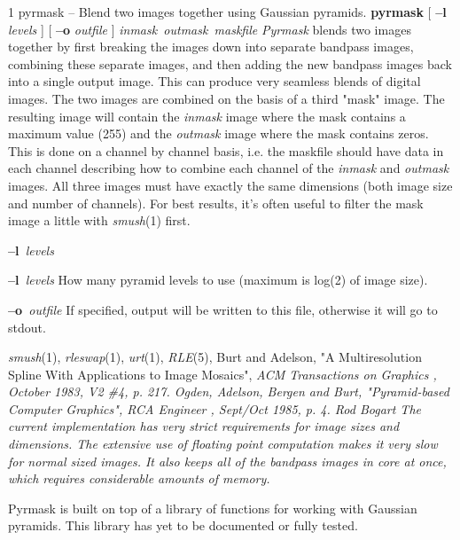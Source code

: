 %
%
%
 1
pyrmask -- Blend two images together using Gaussian pyramids.
{\bf pyrmask} 
[
{\bf --l}
{\it levels}
] [
{\bf --o}
{\it outfile}
]
{\it inmask\ outmask\ maskfile}
{\it Pyrmask}
blends two images together by first breaking the images down into
separate bandpass images, combining these separate images, and then adding
the new bandpass images back into a single output image.  This can produce
very seamless blends of digital images.  The two images
are combined on the basis of a third "mask" image.  The resulting image
will contain the 
{\it inmask}
image where the mask contains a maximum value (255) and the 
{\it outmask} 
image where the mask contains zeros.  This is done on a channel by channel
basis, i.e. the maskfile should have data in each channel describing how
to combine each channel of the 
{\it inmask}
and
{\it outmask}
images.  All three images
must have exactly the same dimensions (both image size and number of channels).
For best results, it's often useful to filter the mask image a little with
{\it smush}{\rm (1)}
first.
\begin{TPlist}{{\bf --l}{\it \ levels}
}
\item[{{\bf --l}{\it \ levels}
}]
How many pyramid levels to use (maximum is log(2) of image size).
\item[{{\bf --o}{\it \ outfile}
}]
If specified, output will be written to this file, otherwise it will
go to stdout.
\end{TPlist}
{\it smush}{\rm (1),}
{\it rleswap}{\rm (1),}
{\it urt}{\rm (1),}
{\it RLE}{\rm (5),}
\nwl
Burt and Adelson, "A Multiresolution Spline With Applications to Image
Mosaics", %
\it ACM Transactions on Graphics\rm%
, October 1983, V2 \#4, p. 217.
\nwl
Ogden, Adelson, Bergen and Burt, "Pyramid-based Computer Graphics", %
\it RCA
Engineer\rm%
, Sept/Oct 1985, p. 4.
Rod Bogart
The current implementation has very
strict requirements for image sizes and dimensions.  The extensive
use of floating point computation makes it very slow for normal sized
images.  It also keeps all of the bandpass images in core at
once, which requires considerable amounts of memory.

Pyrmask is built on top of a library of functions for working with
Gaussian pyramids.  This library has yet to be documented or fully
tested.
\newpage


